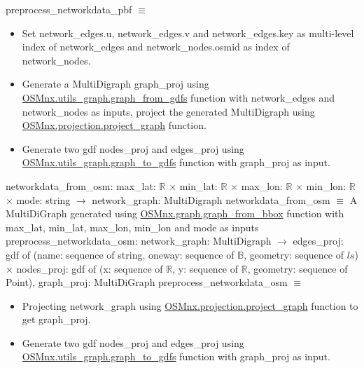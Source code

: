 \documentclass[12pt, titlepage]{article}
\begin{document}
preprocess\_networkdata\_pbf $\equiv$ 
\begin{itemize}
\item Set network\_edges.u, network\_edges.v and network\_edges.key as multi-level index of  network\_edges and network\_nodes.osmid as index of network\_nodes.
\item Generate a MultiDigraph graph\_proj using \href{https://osmnx.readthedocs.io/en/stable/osmnx.html#osmnx.utils_graph.graph_from_gdfs}{OSMnx.utils\_graph.graph\_from\_gdfs} function with network\_edges and network\_nodes as inputs, project the generated MultiDigraph using \href{https://osmnx.readthedocs.io/en/stable/osmnx.html#osmnx.projection.project_graph}{OSMnx.projection.project\_graph} function.
\item Generate two gdf nodes\_proj and edges\_proj using \href{https://osmnx.readthedocs.io/en/stable/osmnx.html#osmnx.projection.project_graph}{OSMnx.utils\_graph.graph\_to\_gdfs} function with graph\_proj as input. 
\end{itemize}
networkdata\_from\_osm: max\_lat: $\mathbb{R}$ $\times$ min\_lat: $\mathbb{R}$ $\times$ max\_lon: $\mathbb{R}$ $\times$ min\_lon: $\mathbb{R}$ $\times$ mode: string $\rightarrow$ network\_graph: MultiDigraph\newline
networkdata\_from\_osm $\equiv$ A MultiDiGraph generated using \href{https://osmnx.readthedocs.io/en/stable/osmnx.html#osmnx.graph.graph_from_bbox}{OSMnx.graph.graph\_from\_bbox} function with max\_lat, min\_lat, max\_lon, min\_lon and mode as inputs\newline\newline
preprocess\_networkdata\_osm: network\_graph: MultiDigraph $\rightarrow$ edges\_proj: gdf of (name: sequence of string, oneway: sequence of $\mathbb{B}$, geometry: sequence of $ls$) $\times$ nodes\_proj: gdf of (x: sequence of $\mathbb{R}$, y: sequence of $\mathbb{R}$, geometry: sequence of Point), graph\_proj: MultiDiGraph \newline
preprocess\_networkdata\_osm $\equiv$ 
\begin{itemize}
\item Projecting network\_graph using \href{https://osmnx.readthedocs.io/en/stable/osmnx.html#osmnx.projection.project_graph}{OSMnx.projection.project\_graph} function to get graph\_proj.
\item Generate two gdf nodes\_proj and edges\_proj using \href{https://osmnx.readthedocs.io/en/stable/osmnx.html#osmnx.projection.project_graph}{OSMnx.utils\_graph.graph\_to\_gdfs} function with graph\_proj as input. 
\end{itemize}
\end{document}
